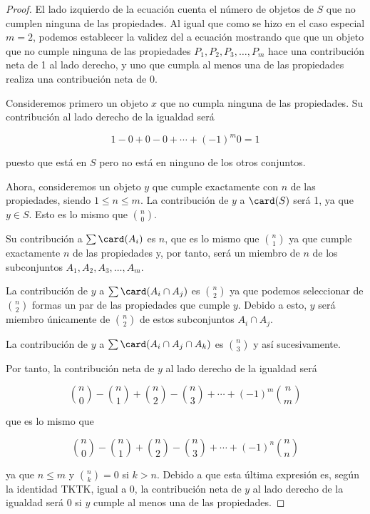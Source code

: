 \begin{proof}
  El lado izquierdo de la ecuación cuenta el número de objetos de $S$ que no
  cumplen ninguna de las propiedades. Al igual que como se hizo en el caso
  especial $m = 2$, podemos establecer la validez del a ecuación mostrando
  que que un objeto que no cumple ninguna de las propiedades $P_1, P_2, P_3,
  \ldots, P_m$ hace una contribución neta de 1 al lado derecho, y uno que
  cumpla al menos una de las propiedades realiza una contribución neta de 0.

  Consideremos primero un objeto $x$ que no cumpla ninguna de las
  propiedades. Su contribución al lado derecho de la igualdad será

  $$ 1 - 0 + 0 - 0 + \cdots + ({-1})^m 0 = 1 $$

  \noindent puesto que está en $S$ pero no está en ninguno de los otros
  conjuntos.

  Ahora, consideremos un objeto $y$ que cumple exactamente con $n$ de las
  propiedades, siendo $1 \leq n \leq m$. La contribución de $y$ a $\card(S)$
  será 1, ya que $y \in S$. Esto es lo mismo que ${n \choose 0}$.

  Su contribución a $\sum \card(A_i)$ es $n$, que es lo mismo que ${n
  \choose 1}$ ya que cumple exactamente $n$ de las propiedades y, por tanto,
  será un miembro de $n$ de los subconjuntos $A_1, A_2, A_3, \ldots, A_m$.

  La contribución de $y$ a $\sum \card(A_i \cap A_j)$ es ${n \choose 2}$ ya
  que podemos seleccionar de ${n \choose 2}$ formas un par de las
  propiedades que cumple $y$. Debido a esto, $y$ será miembro únicamente de
  ${n \choose 2}$ de estos subconjuntos $A_i \cap A_j$.

  La contribución de $y$ a $\sum \card(A_i \cap A_j \cap A_k)$ es ${n
  \choose 3}$ y así sucesivamente.

  Por tanto, la contribución neta de $y$ al lado derecho de la igualdad será

  $$ {n \choose 0} - {n \choose 1} + {n \choose 2} - {n \choose 3} + \cdots
  + ({-1})^m {n \choose m} $$

  \noindent que es lo mismo que

  $$ {n \choose 0} - {n \choose 1} + {n \choose 2} - {n \choose 3} + \cdots
  + ({-1})^n {n \choose n} $$

  \noindent ya que $n \leq m$ y ${n \choose k} = 0$ si $k > n$. Debido a que
  esta última expresión es, según la identidad TKTK, igual a 0, la
  contribución neta de $y$ al lado derecho de la igualdad será 0 si $y$
  cumple al menos una de las propiedades.
\end{proof}

